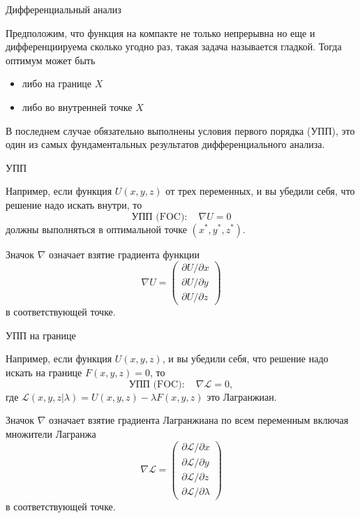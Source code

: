 \documentclass{beamer}
\begin{document}
\begin{frame}{Дифференциальный анализ}

Предположим, что функция на компакте не только непрерывна но еще и дифференциируема сколько угодно раз, такая задача называется \alert{гладкой}. Тогда оптимум может быть

\begin{itemize}
  \item либо на границе $X$
  \item либо во внутренней точке $X$
\end{itemize}

В последнем случае обязательно выполнены \alert{условия первого порядка} (УПП), это один из самых фундаментальных результатов дифференциального анализа.

\end{frame}

\begin{frame}{УПП}

Например, если функция $U(x, y, z)$ от трех переменных, и вы убедили себя, что решение надо искать внутри, то
$$\text{УПП (FOC)}: \quad  \nabla U = 0$$ 
должны выполняться в оптимальной точке $(x^{\ast}, y^{\ast}, z^{\ast})$. 

Значок $\nabla$ означает взятие градиента функции $$ \nabla U = \begin{pmatrix} \partial U/\partial x \\ \partial U/\partial y \\ \partial U/\partial z \end{pmatrix}$$
в соответствующей точке.

\end{frame}

\begin{frame}{УПП на границе}

Например, если функция $U(x, y, z)$, и вы убедили себя, что решение надо искать на границе $F(x,y,z) = 0$, то
$$\text{УПП (FOC)}: \quad  \nabla \mathcal{L} = 0, $$ 
где $\mathcal{L}(x,y,z|\lambda) = U(x, y, z) - \lambda F(x,y,z)$ это \alert{Лагранжиан}.

Значок $\nabla$ означает взятие градиента Лагранжиана по всем переменным включая множители Лагранжа $$ \nabla \mathcal{L} = \begin{pmatrix} \partial \mathcal{L}/\partial x \\ \partial \mathcal{L}/\partial y \\ \partial \mathcal{L}/\partial z \\ \partial \mathcal{L}/\partial \lambda \end{pmatrix}$$
в соответствующей точке.

\end{frame}
\end{document}
